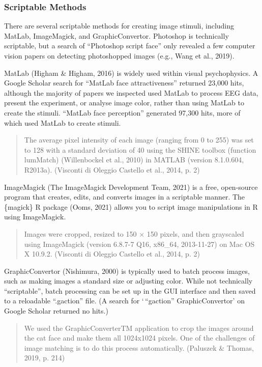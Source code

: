 \documentclass[
  man,floatsintext]{apa6}
\begin{document}
\hypertarget{scriptable-methods}{%
\subsubsection{Scriptable Methods}\label{scriptable-methods}}

There are several scriptable methods for creating image stimuli, including MatLab, ImageMagick, and GraphicConvertor. Photoshop is technically scriptable, but a search of ``Photoshop script face'' only revealed a few computer vision papers on detecting photoshopped images (e.g., Wang et al., 2019).

MatLab (Higham \& Higham, 2016) is widely used within visual psychophysics. A Google Scholar search for ``MatLab face attractiveness'' returned 23,000 hits, although the majority of papers we inspected used MatLab to process EEG data, present the experiment, or analyse image color, rather than using MatLab to create the stimuli. ``MatLab face perception'' generated 97,300 hits, more of which used MatLab to create stimuli.

\begin{quote}
The average pixel intensity of each image (ranging from 0 to 255) was set to 128 with a standard deviation of 40 using the SHINE toolbox (function lumMatch) (Willenbockel et al., 2010) in MATLAB (version 8.1.0.604, R2013a). (Visconti di Oleggio Castello et al., 2014, p. 2)
\end{quote}

ImageMagick (The ImageMagick Development Team, 2021) is a free, open-source program that creates, edits, and converts images in a scriptable manner. The \{magick\} R package (Ooms, 2021) allows you to script image manipulations in R using ImageMagick.

\begin{quote}
Images were cropped, resized to 150 × 150 pixels, and then grayscaled using ImageMagick (version 6.8.7-7 Q16, x86\_64, 2013-11-27) on Mac OS X 10.9.2. (Visconti di Oleggio Castello et al., 2014, p. 2)
\end{quote}

GraphicConvertor (Nishimura, 2000) is typically used to batch process images, such as making images a standard size or adjusting color. While not technically ``scriptable'', batch processing can be set up in the GUI interface and then saved to a reloadable ``.gaction'' file. (A search for `\,``gaction'' GraphicConvertor' on Google Scholar returned no hits.)

\begin{quote}
We used the GraphicConverterTM application to crop the images around the cat face and make them all 1024x1024 pixels. One of the challenges of image matching is to do this process automatically. (Paluszek \& Thomas, 2019, p. 214)
\end{quote}
\end{document}
